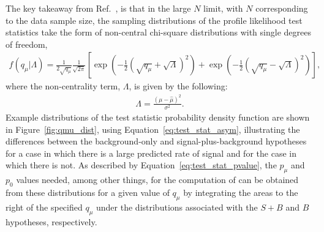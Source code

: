 The key takeaway from Ref.~\cite{AsymptoticFormula}, is that in the large $N$ limit, with $N$
corresponding to the data sample size, the sampling distributions of the profile likelihood test statistics
take the form of non-central chi-square distributions with single degrees of freedom,
\begin{align}
    f(q_{\mu} | \Lambda) = \frac{1}{2\sqrt{q_{\mu}}} \frac{1}{\sqrt{2\pi}} \left[ \exp \left( -\frac{1}{2} (\sqrt{q_{\mu}} + \sqrt{\Lambda})^2 \right) 
        + \exp \left( -\frac{1}{2}(\sqrt{q_{\mu}} - \sqrt{\Lambda} )^2 \right) \right],
    \label{eq:test_stat_asym}
\end{align}
where the non-centrality term, $\Lambda$, is given by the following:
\begin{align}
    \Lambda = \frac{ (\mu - \hat{\mu})^2 } {\sigma^2}.
    \label{eq:noncentrality}
\end{align}
Example distributions of the test statistic probability density function are shown in Figure~\ref{fig:qmu_dist},
using Equation~\ref{eq:test_stat_asym}, illustrating the differences between the background-only
and signal-plus-background hypotheses for a case in which there is a large predicted rate of signal
and for the case in which there is not.
As described by Equation~\ref{eq:test_stat_pvalue}, the $p_{\mu}$ and $p_0$ values needed, among other things, for the computation of \cls can be obtained from these distributions
for a given value of $q_{\mu}$ by integrating the areas to the right of the specified $q_{\mu}$ under the distributions associated
with the $S+B$ and $B$ hypotheses, respectively.

